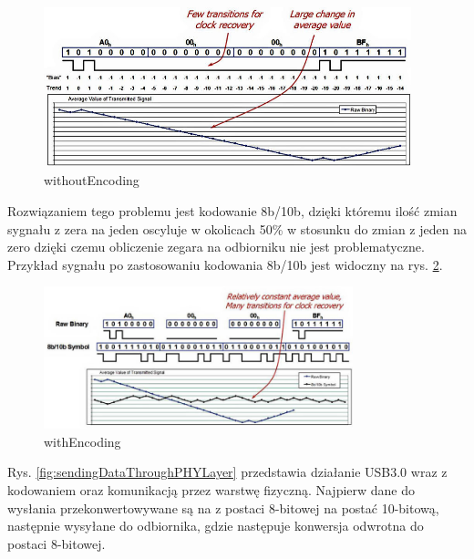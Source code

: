 \documentclass{BscUS}
\begin{document}
\begin{figure}[H]
\centering
\includegraphics[width=0.95\textwidth]{./img/withoutEncoding}
\caption{withoutEncoding}
\label{fig:withoutEncoding}
\end{figure}
\noindent Rozwiązaniem tego problemu jest kodowanie 8b/10b, dzięki któremu ilość zmian sygnału z zera na jeden oscyluje w okolicach 50\% w stosunku do zmian z jeden na zero dzięki czemu obliczenie zegara na odbiorniku nie jest problematyczne. Przykład sygnału po zastosowaniu kodowania 8b/10b jest widoczny na rys. \ref{fig:withEncoding}.
\begin{figure}[H]
\centering
\includegraphics[width=0.8\textwidth]{./img/withEncoding}
\caption{withEncoding}
\label{fig:withEncoding}
\end{figure}
Rys. \ref{fig:sendingDataThroughPHYLayer} przedstawia działanie USB3.0 wraz z kodowaniem oraz komunikacją przez warstwę fizyczną. Najpierw dane do wysłania przekonwertowywane są na z postaci 8-bitowej na postać 10-bitową, następnie wysyłane do odbiornika, gdzie następuje konwersja odwrotna do postaci 8-bitowej.
\end{document}
